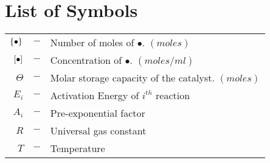 \section*{List of Symbols}

\begin{table}[H]
    \begin{tabular}{r c l}
        $\left\{ \bullet \right\}$ &$-$& Number of moles of $\bullet$. $(moles)$\\
        $\left[ \bullet \right]$ &$-$& Concentration of $\bullet$. $(moles/ml)$\\
        $\Theta$ &$-$& Molar storage capacity of the catalyst. $(moles)$\\
        $E_i$ &$-$& Activation Energy of $i^{th}$ reaction\\
        $A_i$ &$-$& Pre-exponential factor\\
        $R$ &$-$& Universal gas constant\\
        $T$ &$-$& Temperature\\
    \end{tabular}
\end{table}

